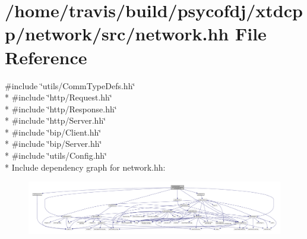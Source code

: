 \hypertarget{network_8hh}{\section{/home/travis/build/psycofdj/xtdcpp/network/src/network.hh File Reference}
\label{network_8hh}
}
{\ttfamily \#include \char`\"{}utils/\-Comm\-Type\-Defs.\-hh\char`\"{}}\\*
{\ttfamily \#include \char`\"{}http/\-Request.\-hh\char`\"{}}\\*
{\ttfamily \#include \char`\"{}http/\-Response.\-hh\char`\"{}}\\*
{\ttfamily \#include \char`\"{}http/\-Server.\-hh\char`\"{}}\\*
{\ttfamily \#include \char`\"{}bip/\-Client.\-hh\char`\"{}}\\*
{\ttfamily \#include \char`\"{}bip/\-Server.\-hh\char`\"{}}\\*
{\ttfamily \#include \char`\"{}utils/\-Config.\-hh\char`\"{}}\\*
Include dependency graph for network.\-hh\-:
\nopagebreak
\begin{figure}[H]
\begin{center}
\leavevmode
\includegraphics[width=350pt]{network_8hh__incl}
\end{center}
\end{figure}
